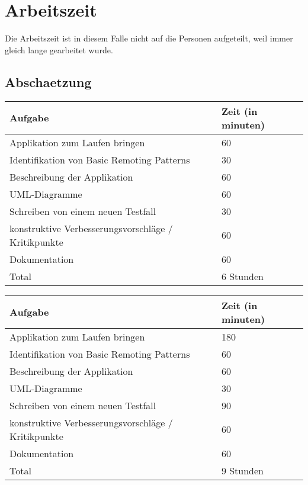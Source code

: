\documentclass[a4paper]{article}
\begin{document}
\section{Arbeitszeit}
Die Arbeitszeit ist in diesem Falle nicht auf die Personen aufgeteilt, weil immer gleich lange gearbeitet wurde.
\subsection{Abschaetzung}
\begin{center}
  \begin{tabular}{ | p{} |  p{}|}
    \hline
    \textbf{Aufgabe} & \textbf{Zeit} (in minuten) \\ 
    \hline 
    \hline
    Applikation zum Laufen bringen & 60 \\ 
    \hline
    Identifikation von Basic Remoting Patterns & 30 \\ 
    \hline
  	Beschreibung der Applikation & 60 \\ 
    \hline
  	UML-Diagramme & 60 \\ 
    \hline
    Schreiben von einem neuen Testfall & 30 \\ 
    \hline
    konstruktive Verbesserungsvorschläge / Kritikpunkte & 60 \\ 
    \hline
   Dokumentation & 60 \\ 
    \hline
    \hline
    Total & 6 Stunden \\

    \hline
  \end{tabular}
\end{center}
\begin{center}
  \begin{tabular}{ | p{} |  p{}|}
    \hline
    \textbf{Aufgabe} & \textbf{Zeit} (in minuten) \\ 
    \hline 
    \hline
    Applikation zum Laufen bringen & 180 \\ 
    \hline
    Identifikation von Basic Remoting Patterns & 60 \\ 
    \hline
  	Beschreibung der Applikation & 60 \\ 
    \hline
  	UML-Diagramme & 30 \\ 
    \hline
    Schreiben von einem neuen Testfall & 90 \\ 
    \hline
    konstruktive Verbesserungsvorschläge / Kritikpunkte & 60 \\ 
    \hline
   Dokumentation & 60 \\ 
    \hline
    \hline
    Total & 9 Stunden \\
    \hline
  \end{tabular}
\end{center}
\newpage
\end{document}
